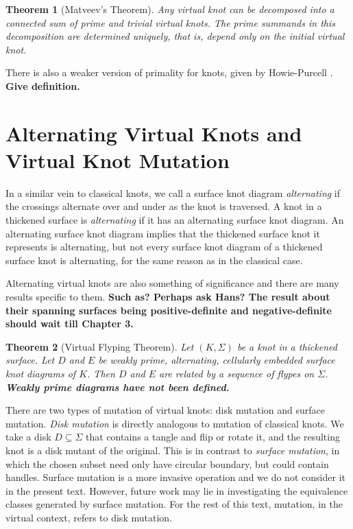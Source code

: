 \documentclass[12pt]{report}
\newcommand{\notered}[1]{{\color{Red} \textbf{#1}}}
\newtheorem*{theorem}{Theorem}
\begin{document}
\begin{theorem}[Matveev's Theorem]
Any virtual knot can be decomposed into a connected sum of prime and trivial virtual knots. The prime summands in this decomposition are determined uniquely, that is, depend only on the initial virtual knot.
\end{theorem}

There is also a weaker version of primality for knots, given by Howie-Purcell \cite{geometry-of-alternating-links-on-surfaces}. \notered{Give definition.}


\section{Alternating Virtual Knots and Virtual Knot Mutation}
In a similar vein to classical knots, we call a surface knot diagram \textit{alternating} if the crossings alternate over and under as the knot is traversed. A knot in a thickened surface is \textit{alternating} if it has an alternating surface knot diagram. An alternating surface knot diagram implies that the thickened surface knot it represents is alternating, but not every surface knot diagram of a thickened surface knot is alternating, for the same reason as in the classical case.

Alternating virtual knots are also something of significance and there are many results specific to them. \notered{Such as? Perhaps ask Hans? The result about their spanning surfaces being positive-definite and negative-definite should wait till Chapter 3.}

\begin{theorem}[Virtual Flyping Theorem]
Let $(K, \Sigma)$ be a knot in a thickened surface. Let $D$ and $E$ be weakly prime, alternating, cellularly embedded surface knot diagrams of $K$. Then $D$ and $E$ are related by a sequence of flypes on $\Sigma$. \notered{Weakly prime diagrams have not been defined.}
\end{theorem}

There are two types of mutation of virtual knots: disk mutation and surface mutation. \textit{Disk mutation} is directly analogous to mutation of classical knots. We take a disk $D \subseteq \Sigma$ that contains a tangle and flip or rotate it, and the resulting knot is a disk mutant of the original. This is in contrast to \textit{surface mutation}, in which the chosen subset need only have circular boundary, but could contain handles. Surface mutation is a more invasive operation and we do not consider it in the present text. However, future work may lie in investigating the equivalence classes generated by surface mutation. For the rest of this text, mutation, in the virtual context, refers to disk mutation.
\end{document}
